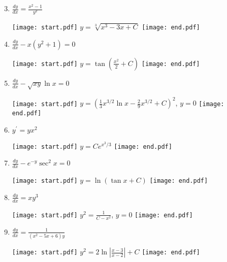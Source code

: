 \documentclass[12pt]{article}
\begin{document}
\begin{enumerate}
\setcounter{enumi}{2}

\item $\frac{dy}{dx}=\frac{x^2-1}{y^2}$

\texttt{[image: start.pdf]}
{{$y=\sqrt[3]{x^3-3x+C}$}}
\texttt{[image: end.pdf]}


\item $\frac{dy}{dx}-x(y^2+1)=0$

\texttt{[image: start.pdf]}
{{$y=\tan{\left(\frac{x^2}{2}+C\right)}$}}
\texttt{[image: end.pdf]}


\item $\frac{dy}{dx}-\sqrt{xy}\ln{x}=0$

\texttt{[image: start.pdf]}
{{$y=\left(\frac{1}{3}x^{3/2}\ln{x}-\frac{2}{9}x^{3/2}+C\right)^2$, $y=0$}}
\texttt{[image: end.pdf]}


\item $y^{\prime}=yx^2$

\texttt{[image: start.pdf]}
{{$y=Ce^{x^3/3}$}}
\texttt{[image: end.pdf]}


\item $\frac{dy}{dx}-e^{-y}\sec^2{x}=0$

\texttt{[image: start.pdf]}
{{$y=\ln{(\tan{x}+C)}$}}
\texttt{[image: end.pdf]}


\end{enumerate}


\begin{enumerate}
\setcounter{enumi}{7}

\item $\frac{dy}{dx}=xy^3$

\texttt{[image: start.pdf]}
{{$y^2=\frac{1}{C-x^2}$, $y=0$}}
\texttt{[image: end.pdf]}


\item $\frac{dy}{dx}=\frac{1}{(x^2-5x+6)y}$

\texttt{[image: start.pdf]}
{{$y^2=2\ln{\left|\frac{x-3}{x-2}\right|}+C$}}
\texttt{[image: end.pdf]}


\end{enumerate}

\end{document}
